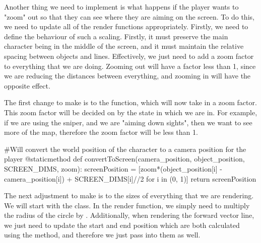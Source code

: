 \vs
Another thing we need to implement is what happens if the player wants to "zoom" out so that they can see where they are aiming on the screen. To do this, we need to update all of the render functions appropriately. Firstly, we need to define the behaviour of such a scaling. Firstly, it must preserve the main character being in the middle of the screen, and it must maintain the relative spacing between objects and lines. Effectively, we just need to add a zoom factor to everything that we are doing. Zooming out will have a factor less than 1, since we are reducing the distances between everything, and zooming in will have the opposite effect.
\vs

The first change to make is to the  function, which will now take in a zoom factor. This zoom factor will be decided on by the state in which we are in. For example, if we are using the sniper, and we are "aiming down sights", then we want to see more of the map, therefore the zoom factor will be less than 1.

\begin{mpy}
    #Will convert the world position of the character to a camera position for the player
    @staticmethod
    def convertToScreen(camera_position, object_position, SCREEN_DIMS, zoom):
        screenPosition = [zoom*(object_position[i] - camera_position[i]) + SCREEN_DIMS[i]//2 for i in (0, 1)]
        return screenPosition
\end{mpy}

The next adjustment to make is to the sizes of everything that we are rendering. We will start with the  class. In the render function, we simply need to multiply the radius of the circle by . Additionally, when rendering the forward vector line, we just need to update the start and end position which are both calculated using the  method, and therefore we just pass  into them as well.

